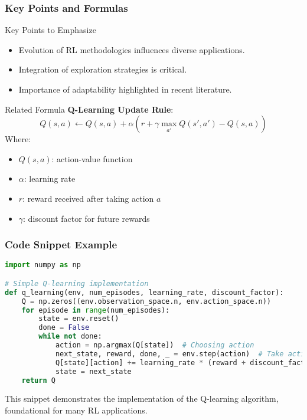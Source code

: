 \documentclass[aspectratio=169]{beamer}
\begin{document}
\begin{frame}[fragile]
    \frametitle{Key Points and Formulas}
    \begin{block}{Key Points to Emphasize}
        \begin{itemize}
            \item Evolution of RL methodologies influences diverse applications.
            \item Integration of exploration strategies is critical.
            \item Importance of adaptability highlighted in recent literature.
        \end{itemize}
    \end{block}
    
    \begin{block}{Related Formula}
        \textbf{Q-Learning Update Rule}:
        \begin{equation}
        Q(s, a) \leftarrow Q(s, a) + \alpha \left( r + \gamma \max_{a'} Q(s', a') - Q(s, a) \right)
        \end{equation}
        Where:
        \begin{itemize}
            \item $Q(s, a)$: action-value function
            \item $\alpha$: learning rate
            \item $r$: reward received after taking action $a$
            \item $\gamma$: discount factor for future rewards
        \end{itemize}
    \end{block}
\end{frame}

\begin{frame}[fragile]
    \frametitle{Code Snippet Example}
    \begin{lstlisting}[language=Python, caption=Simple Q-learning implementation]
import numpy as np

# Simple Q-learning implementation
def q_learning(env, num_episodes, learning_rate, discount_factor):
    Q = np.zeros((env.observation_space.n, env.action_space.n))
    for episode in range(num_episodes):
        state = env.reset()
        done = False
        while not done:
            action = np.argmax(Q[state])  # Choosing action
            next_state, reward, done, _ = env.step(action)  # Take action
            Q[state][action] += learning_rate * (reward + discount_factor * np.max(Q[next_state]) - Q[state][action])
            state = next_state
    return Q
    \end{lstlisting}
    This snippet demonstrates the implementation of the Q-learning algorithm, foundational for many RL applications.
\end{frame}
\end{document}
